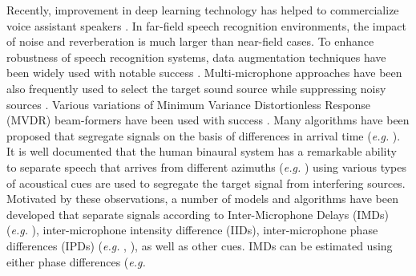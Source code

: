 \documentclass{article}
\begin{document}
\label{BinaryMaskGenerationForTimeFreqBin}
%
Recently, improvement in deep learning technology
\cite{Seltzer2013DNNAurora4, Yu2013FeatureLearningDNN, V_Vanhoucke_Deep_Learning_NIPS_Workshop_2011,
G_Hinton_IEEE_Signal_Process_Mag_2012,
T_Sainath_IEEETran_2017_1, T_Sainath_Book_Chapter_2017_1}
has helped to commercialize voice assistant speakers
\cite{B_Li_INTERSPEECH_2017_1, C_Kim_INTERSPEECH_2017_1}.
In far-field speech recognition environments, the impact of
noise and reverberation is much larger than near-field cases.
To enhance robustness of speech recognition systems,
data augmentation techniques have been
widely used with notable success  \cite{R_Lippmann_icassp_1987_1, w_hartmann_interspeech_2016_00, C_Kim_INTERSPEECH_2017_1,
c_kim_interspeech_2018_00, c_kim_icassp_2018_00,
n_jaitly_icml_workshop_2013_00, C_Kim_ASRU_2009_2}. 
Multi-microphone approaches  
have been also frequently used to select the target sound source while 
suppressing noisy sources \cite{T_Nekatani_ICASSP_2017_1, T_Higuchi_ICASSP_2016_1,
H_Erdogan_INTERSPEECH_2016_1, C_Kim_INTERSPEECH_2015_1}. Various variations
of Minimum Variance Distortionless Response (MVDR) beam-formers
have been used with success \cite{e_habets_taslp_2010_00,
p_chevalier_icassp_2009_00, p_chevalier_ieee_trans_signal_process_2007_00,
j_zhang_ieee_taslp_2018_00}.
 Many algorithms have been proposed that segregate signals on the basis  of
 differences in arrival time (\emph{e.g.} \cite{y_zhang_icassp_2018_00,
 PalomakiBrownWang04,SrinivasanEtAl06,H_Park_SpeechComm_2009, c_kim_icassp_2018_01}).  It is well documented that the human
binaural system has a remarkable ability to separate speech that arrives from different azimuths
(\emph{e.g.} \cite{Grantham95,SternWangBrown06}) using
various types of acoustical cues are used to segregate the target signal from 
interfering sources.
 Motivated by these observations, a number of models and algorithms
have been developed  that separate signals according to Inter-Microphone Delays
(IMDs) (\emph{e.g.} \cite{SrinivasanEtAl06, H_Park_SpeechComm_2009}), inter-microphone intensity difference (IIDs), inter-microphone
phase differences (IPDs) (\emph{e.g.} \cite{P_Aarabi_IEEETranSysManCyber_2005}, \cite{D_Halupka_ICASSP_2005}), as well as other cues.  IMDs can be estimated using either phase differences (\emph{e.g.}
\end{document}
